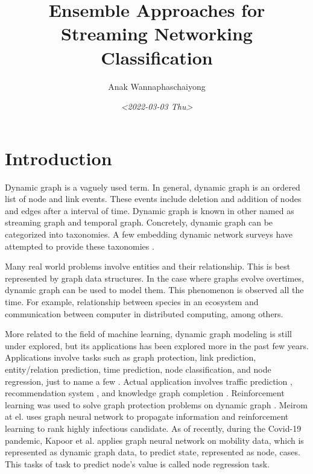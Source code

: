 \documentclass{IEEEtran}
\author{Anak Wannaphaschaiyong}
\date{\textit{<2022-03-03 Thu>}}
\title{Ensemble Approaches for Streaming Networking Classification}
\begin{document}
\maketitle

\section{Introduction}
\label{sec:orgabaa8c5}
Dynamic graph is a vaguely used term. In general, dynamic graph is an ordered list of node and link events. These events include deletion and addition of nodes and edges after a interval of time.
Dynamic graph is known in other named as streaming graph and temporal graph. Concretely, dynamic graph can be categorized into taxonomies. A few embedding dynamic network surveys have attempted to provide these taxonomies \cite{barrosSurveyEmbeddingDynamic2021,kazemiRepresentationLearningDynamica,skardingFoundationsModelingDynamic2021}.

Many real world problems involve entities and their relationship. This is best represented by graph data structures. In the case where graphs evolve overtimes, dynamic graph can be used to model them. This phenomenon is observed all the time. For example, relationship between species in an ecosystem and communication between computer in distributed computing, among others.

More related to the field of machine learning, dynamic graph modeling is still under explored, but its applications has been explored more in the past few years. Applications involve tasks such as graph protection, link prediction, entity/relation prediction, time prediction, node classification, and node regression, just to name a few \cite{kazemiRepresentationLearningDynamica}. Actual application involves traffic prediction \cite{yuanSurveyTrafficPrediction2021}, recommendation system \cite{kazemiRepresentationLearningDynamica}, and knowledge graph completion \cite{cai2022temporal}. Reinforcement learning was used to solve graph protection problems on dynamic graph \cite{wijayanto2018learning,wijayanto2019effective}. Meirom at el. \cite{meirom2021controlling} uses graph neural network to propagate information and reinforcement learning to rank highly infectious candidate. As of recently, during the Covid-19 pandemic, Kapoor et al. \cite{kapoor2020examining}  applies graph neural network on mobility data, which is represented as dynamic graph data, to predict state, represented as node, cases. This tasks of task to predict node's value is called node regression task.
\end{document}
